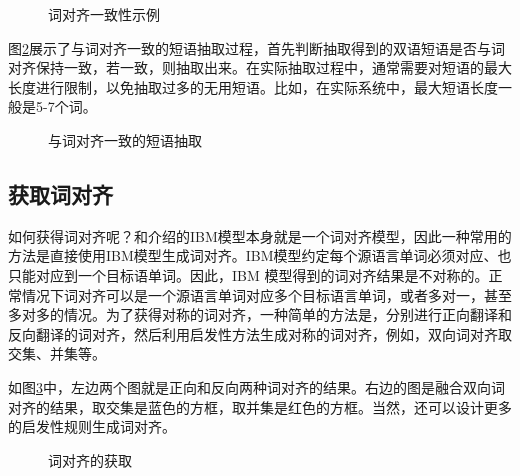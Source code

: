\begin{figure}[htp]
\centering

\caption{词对齐一致性示例}
\label{fig:7-11}
\end{figure}

\parinterval 图\ref{fig:7-12}展示了与词对齐一致的短语抽取过程，首先判断抽取得到的双语短语是否与词对齐保持一致，若一致，则抽取出来。在实际抽取过程中，通常需要对短语的最大长度进行限制，以免抽取过多的无用短语。比如，在实际系统中，最大短语长度一般是5-7个词。

\begin{figure}[htp]
\centering

\caption{与词对齐一致的短语抽取}
\label{fig:7-12}
\end{figure}


\subsection{获取词对齐}

\parinterval 如何获得词对齐呢？{\chapterfive}和{\chaptersix}介绍的IBM模型本身就是一个词对齐模型，因此一种常用的方法是直接使用IBM模型生成词对齐。IBM模型约定每个源语言单词必须对应、也只能对应到一个目标语单词。因此，IBM 模型得到的词对齐结果是不对称的。正常情况下词对齐可以是一个源语言单词对应多个目标语言单词，或者多对一，甚至多对多的情况。为了获得对称的词对齐，一种简单的方法是，分别进行正向翻译和反向翻译的词对齐，然后利用启发性方法生成对称的词对齐，例如，双向词对齐取交集、并集等。

\parinterval 如图\ref{fig:7-13}中，左边两个图就是正向和反向两种词对齐的结果。右边的图是融合双向词对齐的结果，取交集是蓝色的方框，取并集是红色的方框。当然，还可以设计更多的启发性规则生成词对齐。

\begin{figure}[htp]
\centering

\caption{词对齐的获取}
\label{fig:7-13}
\end{figure}

